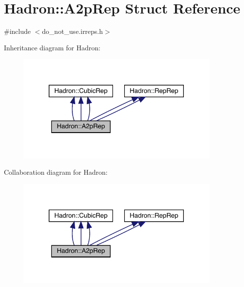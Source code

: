 \hypertarget{structHadron_1_1A2pRep}{}\section{Hadron\+:\+:A2p\+Rep Struct Reference}
\label{structHadron_1_1A2pRep}


{\ttfamily \#include $<$do\+\_\+not\+\_\+use.\+irreps.\+h$>$}



Inheritance diagram for Hadron\+:
\nopagebreak
\begin{figure}[H]
\begin{center}
\leavevmode
\includegraphics[width=288pt]{dc/de5/structHadron_1_1A2pRep__inherit__graph}
\end{center}
\end{figure}


Collaboration diagram for Hadron\+:
\nopagebreak
\begin{figure}[H]
\begin{center}
\leavevmode
\includegraphics[width=288pt]{db/d64/structHadron_1_1A2pRep__coll__graph}
\end{center}
\end{figure}
